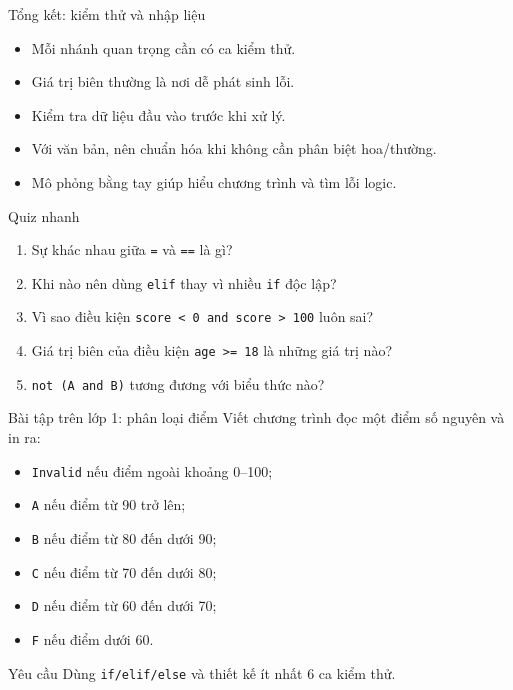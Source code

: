 \documentclass[aspectratio=169,11pt]{beamer}
\newcommand{\code}[1]{\texttt{#1}}
\begin{document}
\begin{frame}{Tổng kết: kiểm thử và nhập liệu}
\begin{itemize}
  \item Mỗi nhánh quan trọng cần có ca kiểm thử.
  \item Giá trị biên thường là nơi dễ phát sinh lỗi.
  \item Kiểm tra dữ liệu đầu vào trước khi xử lý.
  \item Với văn bản, nên chuẩn hóa khi không cần phân biệt hoa/thường.
  \item Mô phỏng bằng tay giúp hiểu chương trình và tìm lỗi logic.
\end{itemize}
\end{frame}

\begin{frame}{Quiz nhanh}
\begin{enumerate}
  \item Sự khác nhau giữa \code{=} và \code{==} là gì?
  \item Khi nào nên dùng \code{elif} thay vì nhiều \code{if} độc lập?
  \item Vì sao điều kiện \code{score < 0 and score > 100} luôn sai?
  \item Giá trị biên của điều kiện \code{age >= 18} là những giá trị nào?
  \item \code{not (A and B)} tương đương với biểu thức nào?
\end{enumerate}
\end{frame}

\begin{frame}[fragile]{Bài tập trên lớp 1: phân loại điểm}
Viết chương trình đọc một điểm số nguyên và in ra:
\begin{itemize}
  \item \code{Invalid} nếu điểm ngoài khoảng 0--100;
  \item \code{A} nếu điểm từ 90 trở lên;
  \item \code{B} nếu điểm từ 80 đến dưới 90;
  \item \code{C} nếu điểm từ 70 đến dưới 80;
  \item \code{D} nếu điểm từ 60 đến dưới 70;
  \item \code{F} nếu điểm dưới 60.
\end{itemize}
\begin{block}{Yêu cầu}
Dùng \code{if/elif/else} và thiết kế ít nhất 6 ca kiểm thử.
\end{block}
\end{frame}
\end{document}

